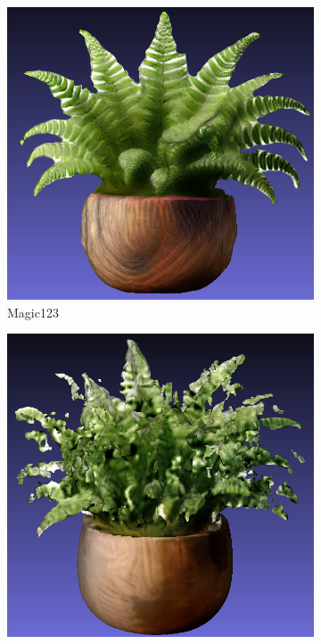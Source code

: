 \begin{figure}[ht]
    \begin{subfigure}[b]{0.28\textwidth}
        \centering
        \includegraphics[width=\textwidth]{etc/a high-quality rendering of a fern in a wooden pot/magic123/magic123_fern_front_result.png}
        \caption{Magic123}
        \vspace{0.1cm}
    \end{subfigure}
    \begin{subfigure}[b]{0.27\textwidth}
        \centering
        \includegraphics[width=\textwidth]{etc/a high-quality rendering of a fern in a wooden pot/wonder3D/wonder3d_fern_result.png}

\end{subfigure}
\end{figure}
